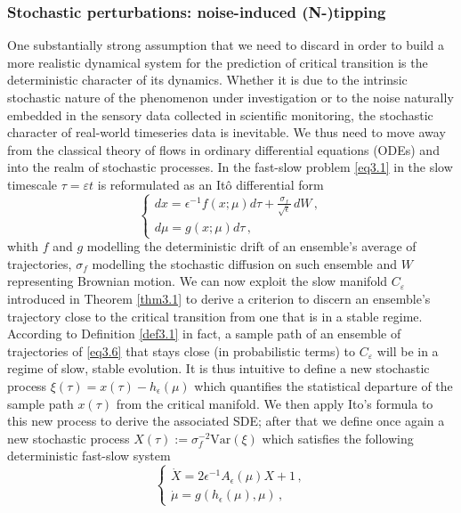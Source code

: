 \documentclass[../main.tex]{subfiles}
\begin{document}
\subsubsection{Stochastic perturbations: noise-induced (N-)tipping}\label{subsubsec3.1.3}
One substantially strong assumption that we need to discard in order to build a more realistic dynamical system for the prediction of critical transition is the deterministic character of its dynamics.
Whether it is due to the intrinsic stochastic nature of the phenomenon under investigation or to the noise naturally embedded in the sensory data collected in scientific monitoring, the stochastic character of real-world timeseries data is inevitable.
We thus need to move away from the classical theory of flows in ordinary differential equations (ODEs) and into the realm of stochastic processes.
In \cite{Kuehn11} the fast-slow problem \eqref{eq3.1} in the slow timescale $\tau=\varepsilon t$ is reformulated as an Itô differential form
\begin{equation}\label{eq3.6}
   \begin{cases}
      dx = \epsilon^{-1} f(x;\mu)d\tau + \frac{\sigma_f}{\sqrt{\epsilon}}\,dW\,, \\
      d\mu = g(x;\mu)d\tau\,, 
   \end{cases}
\end{equation}
whith $f$ and $g$ modelling the deterministic drift of an ensemble's average of trajectories, $\sigma_{f}$ modelling the stochastic diffusion on such ensemble and $W$ representing Brownian motion.
We can now exploit the slow manifold $C_{\varepsilon}$ introduced in Theorem \ref{thm3.1} to derive a criterion to discern an ensemble's trajectory close to the critical transition from one that is in a stable regime.
According to Definition \ref{def3.1} in fact, a sample path of an ensemble of trajectories of \eqref{eq3.6} that stays close (in probabilistic terms) to $C_{\varepsilon}$ will be in a regime of slow, stable evolution.
It is thus intuitive to define a new stochastic process $\xi(\tau)=x(\tau)-h_{\epsilon}(\mu)$ which quantifies the statistical departure of the sample path $x(\tau)$ from the critical manifold. 
We then apply Ito's formula to this new process to derive the associated SDE; after that we define once again a new stochastic process $X(\tau):=\sigma_f^{-2} \text{Var}(\xi)$ which satisfies the following deterministic fast-slow system
\begin{equation}\label{eq3.7}
   \begin{cases}
      \dot{X} = 2\epsilon^{-1}A_{\epsilon}(\mu)X +1 \,, \\
      \dot{\mu} = g(h_{\epsilon}(\mu),\mu) \,, 
   \end{cases}
\end{equation}
\end{document}
